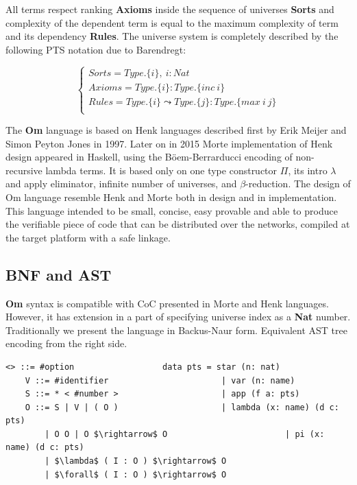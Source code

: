 \documentclass{aip-cp}
\begin{document}
All terms respect ranking {\bf Axioms} inside the sequence of universes {\bf Sorts} and complexity of the
dependent term is equal to the maximum complexity of term and its dependency {\bf Rules}. The universe
system is completely described by the following PTS notation due to Barendregt\cite{Henk93}:

$$
\begin{cases}
Sorts = Type.\{i\},\ i : Nat\\
Axioms = Type.\{i\} : Type.\{inc\ i\}\\
Rules = Type.\{i\} \leadsto Type.\{j\} : Type.\{max\ i\ j\}\\
\end{cases}
$$

The {\bf Om} language is based on Henk languages described first
by Erik Meijer and Simon Peyton Jones in 1997\cite{Erik97}. Later on in 2015 Morte implementation
of Henk design appeared in Haskell, using the Böem-Berrarducci encoding of non-recursive lambda terms.
It is based only on one type constructor {\bf $\Pi$}, its intro {\bf $\lambda$} and apply eliminator,
infinite number of universes, and {\bf $\beta$}-reduction. The design of Om language resemble
Henk and Morte both in design and in implementation. This language intended to be small,
concise, easy provable and able to produce the verifiable piece of code that can be
distributed over the networks, compiled at the target platform with a safe linkage.

\subsection{BNF and AST}

{\bf Om} syntax is compatible with CoC presented in Morte and Henk languages.
However, it has extension in a part of specifying universe index as a {\bf Nat} number.
Traditionally we present the language in Backus-Naur form.
Equivalent AST tree encoding from the right side.

\begin{lstlisting}[mathescape=true]
   <> ::= #option                  data pts = star (n: nat)
    V ::= #identifier                       | var (n: name)
    S ::= * < #number >                     | app (f a: pts)
    O ::= S | V | ( O )                     | lambda (x: name) (d c: pts)
        | O O | O $\rightarrow$ O                        | pi (x: name) (d c: pts)
        | $\lambda$ ( I : O ) $\rightarrow$ O
        | $\forall$ ( I : O ) $\rightarrow$ O
\end{lstlisting}
\end{document}
